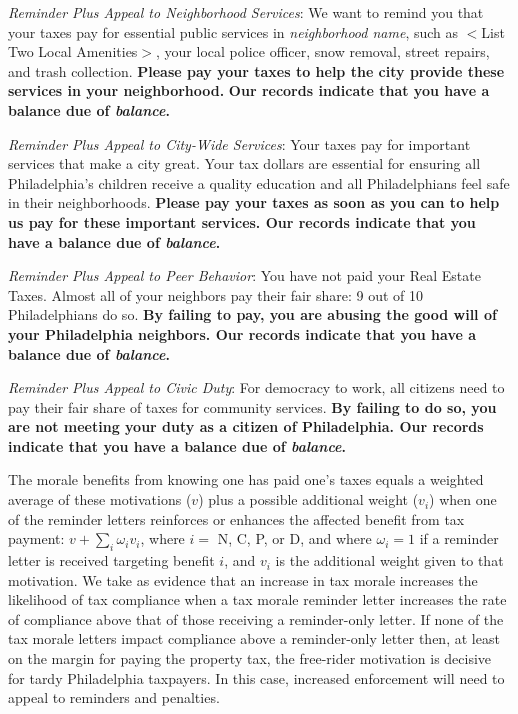 \bigskip

\noindent \textit{Reminder Plus Appeal to Neighborhood Services}: We
want to remind you that your taxes pay for essential public services
in \textit{neighborhood name}, such as $<$List Two Local Amenities$>$,
your local police officer, snow removal, street repairs, and trash
collection.  \textbf{Please pay your taxes to help the city provide
  these services in your neighborhood.} \textbf{Our records indicate
  that you have a balance due of \textit{balance}.}

\bigskip

\noindent \textit{Reminder Plus Appeal to City-Wide Services}: Your
taxes pay for important services that make a city great. Your tax
dollars are essential for ensuring all Philadelphia's children receive
a quality education and all Philadelphians feel safe in their
neighborhoods.  \textbf{Please pay your taxes as soon as you can to
  help us pay for these important services.  Our records indicate that
  you have a balance due of \textit{balance}.}

\bigskip

\noindent \textit{Reminder Plus Appeal to Peer Behavior}: You have not
paid your Real Estate Taxes.  Almost all of your neighbors pay their
fair share: 9 out of 10 Philadelphians do so.  \textbf{By failing to
  pay, you are abusing the good will of your Philadelphia neighbors.
  Our records indicate that you have a balance due of
  \textit{balance}.}

\bigskip

\noindent \textit{Reminder Plus Appeal to Civic Duty}: For democracy
to work, all citizens need to pay their fair share of taxes for
community services.  \textbf{By failing to do so, you are not meeting
  your duty as a citizen of Philadelphia.  Our records indicate that
  you have a balance due of \textit{balance}.}

\bigskip

The morale benefits from knowing one has paid one's taxes equals a
weighted average of these motivations ($v$) plus a possible additional
weight ($v_{i}$) when one of the reminder letters reinforces or
enhances the affected benefit from tax payment: $v + \sum_{i}
\omega_{i} v_{i}$, where $i =$ N, C, P, or D, and where $\omega_{i} =
1$ if a reminder letter is received targeting benefit $i$, and $v_{i}$
is the additional weight given to that motivation. We take as evidence
that an increase in tax morale increases the likelihood of tax
compliance when a tax morale reminder letter increases the rate of
compliance above that of those receiving a reminder-only letter.  If
none of the tax morale letters impact compliance above a reminder-only
letter then, at least on the margin for paying the property tax, the
free-rider motivation is decisive for tardy Philadelphia
taxpayers.  In this case, increased enforcement will need to appeal to
reminders and penalties.

